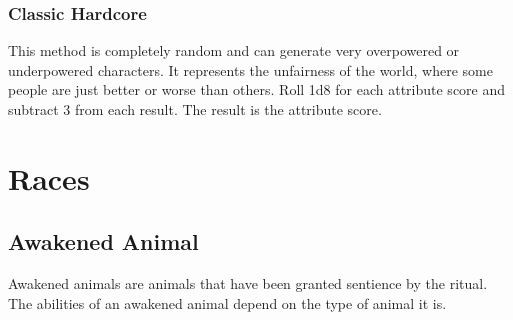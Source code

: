 \begin{comment}
            \subsubsection{Weighted Semi-Randomized Point Buy}
                This method gives you more control over your attribute scores, while still requiring you to deal with attribute score advantages or disadvantages that you might not have chosen. It functions like the semi-randomized point buy method, except that you do not roll 3d6 for every attribute score. You have a pool of 18 dice. You can distribute those dice as you choose between each attribute score, except the last one, which is automatically assigned your remaining points. If you roll more than three dice for an attribute score, keep only the highest 3 dice. If you assign fewer than three dice to roll for an attribute score, add 1 to the result for every die less than 3 you are rolling. You can roll as many as six dice for a single attribute score, and you cannot roll less than one die for an attribute score.

                For example, player hoping to play a barbarian might assign six dice to Strength, five dice to Constitution, three dice to Dexterity, and two dice to each of Intelligence and Perception, leaving the rest of the points to Willpower.
\end{comment}

        \subsubsection{Classic Hardcore}

            This method is completely random and can generate very overpowered or underpowered characters. It represents the unfairness of the world, where some people are just better or worse than others. Roll 1d8 for each attribute score and subtract 3 from each result. The result is the attribute score.

            \newpage

\section{Races}

    \subsection{Awakened Animal}

        Awakened animals are animals that have been granted sentience by the  ritual.
        The abilities of an awakened animal depend on the type of animal it is.

